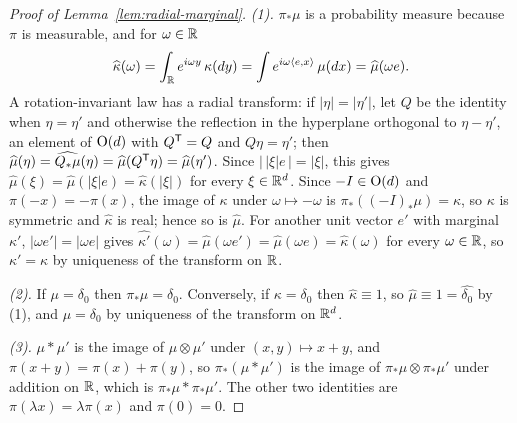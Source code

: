 \begin{proof}[Proof of Lemma~\ref{lem:radial-marginal}]
\emph{(1).} $\pi_*\mu$ is a probability measure because $\pi$ is measurable, and for $\omega \in \mathbb{R}$
\[
  \widehat\kappa(\omega) = \int_{\mathbb{R}} e^{i\omega y}\,\kappa(dy)
   = \int e^{i\omega\langle e, x\rangle}\,\mu(dx) = \widehat\mu(\omega e) .
\]
A rotation-invariant law has a radial transform: if $|\eta| = |\eta'|$, let $Q$ be the identity when
$\eta = \eta'$ and otherwise the reflection in the hyperplane orthogonal to $\eta - \eta'$, an
element of $\mathrm{O}(d)$ with $Q^{\mathsf{T}} = Q$ and $Q\eta = \eta'$; then
$\widehat\mu(\eta) = \widehat{Q_*\mu}(\eta) = \widehat\mu(Q^{\mathsf{T}}\eta) = \widehat\mu(\eta')$.
Since $|\,|\xi|e\,| = |\xi|$, this gives $\widehat\mu(\xi) = \widehat\mu(|\xi|e) =
\widehat\kappa(|\xi|)$ for every $\xi \in \mathbb{R}^d$. Since $-I \in \mathrm{O}(d)$ and $\pi(-x) = -\pi(x)$,
the image of $\kappa$ under $\omega \mapsto -\omega$ is $\pi_*((-I)_*\mu) = \kappa$, so $\kappa$ is
symmetric and $\widehat\kappa$ is real; hence so is $\widehat\mu$. For another unit vector $e'$ with
marginal $\kappa'$, $|\omega e'| = |\omega e|$ gives $\widehat{\kappa'}(\omega) = \widehat\mu(\omega e')
= \widehat\mu(\omega e) = \widehat\kappa(\omega)$ for every $\omega \in \mathbb{R}$, so $\kappa' = \kappa$
by uniqueness of the transform on $\mathbb{R}$.

\emph{(2).} If $\mu = \delta_0$ then $\pi_*\mu = \delta_0$. Conversely, if $\kappa = \delta_0$ then
$\widehat\kappa \equiv 1$, so $\widehat\mu \equiv 1 = \widehat{\delta_0}$ by (1), and
$\mu = \delta_0$ by uniqueness of the transform on $\mathbb{R}^d$.

\emph{(3).} $\mu * \mu'$ is the image of $\mu \otimes \mu'$ under $(x,y) \mapsto x + y$, and
$\pi(x+y) = \pi(x) + \pi(y)$, so $\pi_*(\mu * \mu')$ is the image of $\pi_*\mu \otimes \pi_*\mu'$
under addition on $\mathbb{R}$, which is $\pi_*\mu * \pi_*\mu'$. The other two identities are
$\pi(\lambda x) = \lambda\pi(x)$ and $\pi(0) = 0$.
\end{proof}

